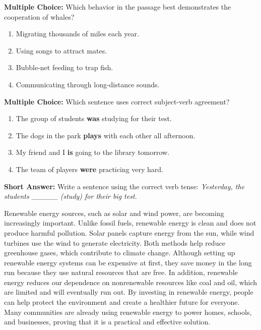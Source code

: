 \documentclass[12pt]{article}
\begin{document}
\begin{tcolorbox}[colframe=black!50, colback=white, title=Question 7]
\textbf{Multiple Choice:} Which behavior in the passage best demonstrates the cooperation of whales?  
\begin{enumerate}[label=(\Alph*)]
\item Migrating thousands of miles each year.  
\item Using songs to attract mates.  
\item Bubble-net feeding to trap fish.  
\item Communicating through long-distance sounds.  
\end{enumerate}
\end{tcolorbox}

\begin{tcolorbox}[colframe=black!50, colback=white, title=Question 8]
\textbf{Multiple Choice:} Which sentence uses correct subject-verb agreement?  
\begin{enumerate}[label=(\Alph*)]
\item The group of students \textbf{was} studying for their test.  
\item The dogs in the park \textbf{plays} with each other all afternoon.  
\item My friend and I \textbf{is} going to the library tomorrow.  
\item The team of players \textbf{were} practicing very hard.  
\end{enumerate}
\end{tcolorbox}


\begin{tcolorbox}[colframe=black!50, colback=white, title=Question 9]
\textbf{Short Answer:} Write a sentence using the correct verb tense:  
\textit{Yesterday, the students \_\_\_\_\_ (study) for their big test.}  

\vspace{2em}
 \underline{\hspace{15.8cm}}  
\end{tcolorbox}

\begin{tcolorbox}[colframe=black!50, colback=white, title=Passage: The Benefits of Renewable Energy]
Renewable energy sources, such as solar and wind power, are becoming increasingly important. Unlike fossil fuels, renewable energy is clean and does not produce harmful pollution. Solar panels capture energy from the sun, while wind turbines use the wind to generate electricity. Both methods help reduce greenhouse gases, which contribute to climate change. Although setting up renewable energy systems can be expensive at first, they save money in the long run because they use natural resources that are free. In addition, renewable energy reduces our dependence on nonrenewable resources like coal and oil, which are limited and will eventually run out. By investing in renewable energy, people can help protect the environment and create a healthier future for everyone. Many communities are already using renewable energy to power homes, schools, and businesses, proving that it is a practical and effective solution.
\end{tcolorbox}
\end{document}
